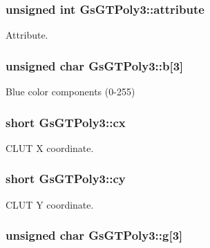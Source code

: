 \subsubsection[{attribute}]{\setlength{\rightskip}{0pt plus 5cm}unsigned int Gs\+G\+T\+Poly3\+::attribute}\label{structGsGTPoly3_a974c933683a793903a7004911d45ff01}


Attribute. 

\hypertarget{structGsGTPoly3_a75426e268d13960d7da50c31f11b4a00}{}
\subsubsection[{b}]{\setlength{\rightskip}{0pt plus 5cm}unsigned char Gs\+G\+T\+Poly3\+::b\mbox{[}3\mbox{]}}\label{structGsGTPoly3_a75426e268d13960d7da50c31f11b4a00}


Blue color components (0-\/255) 

\hypertarget{structGsGTPoly3_a0e3b4b00180357f07f68ef9de4a22b23}{}
\subsubsection[{cx}]{\setlength{\rightskip}{0pt plus 5cm}short Gs\+G\+T\+Poly3\+::cx}\label{structGsGTPoly3_a0e3b4b00180357f07f68ef9de4a22b23}


C\+L\+U\+T X coordinate. 

\hypertarget{structGsGTPoly3_a1504800135de6f86d07517280dedf6cd}{}
\subsubsection[{cy}]{\setlength{\rightskip}{0pt plus 5cm}short Gs\+G\+T\+Poly3\+::cy}\label{structGsGTPoly3_a1504800135de6f86d07517280dedf6cd}


C\+L\+U\+T Y coordinate. 

\hypertarget{structGsGTPoly3_ad9ba5a12d15b625a353aededf0b17f79}{}
\subsubsection[{g}]{\setlength{\rightskip}{0pt plus 5cm}unsigned char Gs\+G\+T\+Poly3\+::g\mbox{[}3\mbox{]}}\label{structGsGTPoly3_ad9ba5a12d15b625a353aededf0b17f79}


